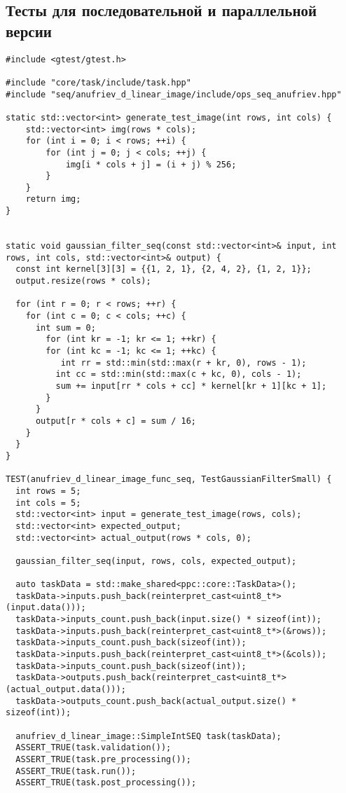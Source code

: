 \documentclass[12pt]{article}
\begin{document}
\subsection*{Тесты для последовательной и параллельной версии}
\begin{lstlisting}
#include <gtest/gtest.h>

#include "core/task/include/task.hpp"
#include "seq/anufriev_d_linear_image/include/ops_seq_anufriev.hpp"

static std::vector<int> generate_test_image(int rows, int cols) {
    std::vector<int> img(rows * cols);
    for (int i = 0; i < rows; ++i) {
        for (int j = 0; j < cols; ++j) {
            img[i * cols + j] = (i + j) % 256;
        }
    }
    return img;
}


static void gaussian_filter_seq(const std::vector<int>& input, int rows, int cols, std::vector<int>& output) {
  const int kernel[3][3] = {{1, 2, 1}, {2, 4, 2}, {1, 2, 1}};
  output.resize(rows * cols);

  for (int r = 0; r < rows; ++r) {
    for (int c = 0; c < cols; ++c) {
      int sum = 0;
        for (int kr = -1; kr <= 1; ++kr) {
        for (int kc = -1; kc <= 1; ++kc) {
           int rr = std::min(std::max(r + kr, 0), rows - 1);
          int cc = std::min(std::max(c + kc, 0), cols - 1);
          sum += input[rr * cols + cc] * kernel[kr + 1][kc + 1];
        }
      }
      output[r * cols + c] = sum / 16;
    }
  }
}

TEST(anufriev_d_linear_image_func_seq, TestGaussianFilterSmall) {
  int rows = 5;
  int cols = 5;
  std::vector<int> input = generate_test_image(rows, cols);
  std::vector<int> expected_output;
  std::vector<int> actual_output(rows * cols, 0);

  gaussian_filter_seq(input, rows, cols, expected_output);

  auto taskData = std::make_shared<ppc::core::TaskData>();
  taskData->inputs.push_back(reinterpret_cast<uint8_t*>(input.data()));
  taskData->inputs_count.push_back(input.size() * sizeof(int));
  taskData->inputs.push_back(reinterpret_cast<uint8_t*>(&rows));
  taskData->inputs_count.push_back(sizeof(int));
  taskData->inputs.push_back(reinterpret_cast<uint8_t*>(&cols));
  taskData->inputs_count.push_back(sizeof(int));
  taskData->outputs.push_back(reinterpret_cast<uint8_t*>(actual_output.data()));
  taskData->outputs_count.push_back(actual_output.size() * sizeof(int));

  anufriev_d_linear_image::SimpleIntSEQ task(taskData);
  ASSERT_TRUE(task.validation());
  ASSERT_TRUE(task.pre_processing());
  ASSERT_TRUE(task.run());
  ASSERT_TRUE(task.post_processing());


\end{lstlisting}
\end{document}
